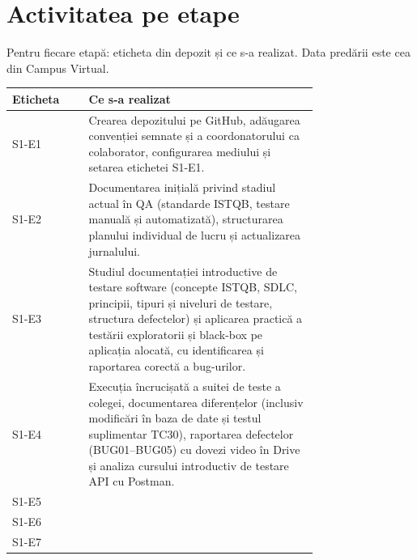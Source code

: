 \chapter{Activitatea pe etape}
Pentru fiecare etapă: eticheta din depozit și ce s-a realizat. Data predării este cea din Campus Virtual.

\begin{center}\sffamily\small
\begin{tabular}{@{}l p{0.75\linewidth}@{}}
\toprule
Eticheta & Ce s-a realizat \\
\midrule
S1-E1 & Crearea depozitului pe GitHub, adăugarea convenției semnate și a coordonatorului ca colaborator, configurarea mediului și setarea etichetei S1-E1.\\
S1-E2 & Documentarea inițială privind stadiul actual în QA (standarde ISTQB, testare manuală și automatizată), structurarea planului individual de lucru și actualizarea jurnalului. \\
S1-E3 & Studiul documentației introductive de testare software (concepte ISTQB, SDLC, principii, tipuri și niveluri de testare, structura defectelor) și aplicarea practică a testării exploratorii și black-box pe aplicația alocată, cu identificarea și raportarea corectă a bug-urilor. \\
S1-E4 & Execuția încrucișată a suitei de teste a colegei, documentarea diferențelor (inclusiv modificări în baza de date și testul suplimentar TC30), raportarea defectelor (BUG01--BUG05) cu dovezi video în Drive și analiza cursului introductiv de testare API cu Postman. \\
S1-E5 & \\
S1-E6 & \\
S1-E7 & \\
\bottomrule
\end{tabular}
\end{center}